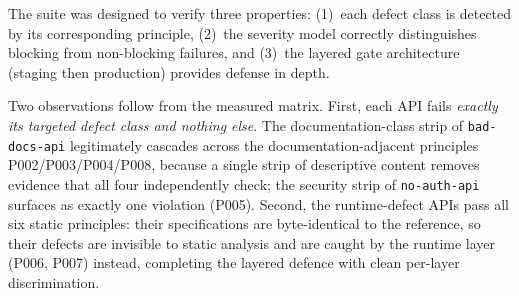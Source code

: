The suite was designed to verify three properties: (1)~each defect class is detected by its corresponding principle, (2)~the severity model correctly distinguishes blocking from non-blocking failures, and (3)~the layered gate architecture (staging then production) provides defense in depth.

\begin{table}[htbp]
\centering
\caption{Empirically measured strict-mode outcomes per API (source: \texttt{results/local/<api>-validate-strict.json}). \textbf{P} = principle fully passed; \textbf{F} = at least one check failed. P006 and P007 are runtime principles not exercised by static validation; their column reports the runtime-layer outcome: ``runtime pass'' = reached the runtime layer and passed, ``runtime fail'' = reached the runtime layer and failed, ``--'' = blocked statically before the runtime layer was reached.}
\label{tab:defect-ground-truth}
\small
{}
\end{table}

Two observations follow from the measured matrix. First, each API fails \emph{exactly its targeted defect class and nothing else}. The documentation-class strip of \texttt{bad-docs-api} legitimately cascades across the documentation-adjacent principles P002/P003/P004/P008, because a single strip of descriptive content removes evidence that all four independently check; the security strip of \texttt{no-auth-api} surfaces as exactly one violation (P005). Second, the runtime-defect APIs pass all six static principles: their specifications are byte-identical to the reference, so their defects are invisible to static analysis and are caught by the runtime layer (P006, P007) instead, completing the layered defence with clean per-layer discrimination.

